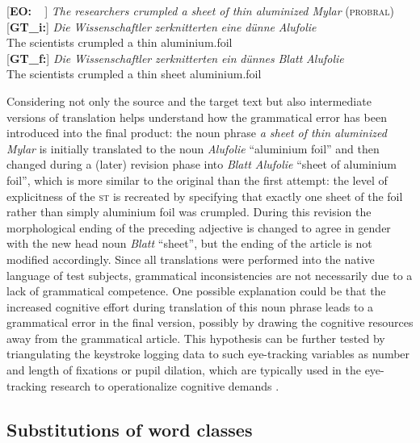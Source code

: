 \documentclass[output=paper]{LSP/langsci}
\begin{document}
\ea \label{ex:1:7}
\begin{xlist}
\exi{}[\textbf{EO:~~}]{ \emph{The researchers crumpled a sheet of thin aluminized Mylar} (\textsc{probral})}
\exi{}[\textbf{GT\_i:}]{
\gll \emph{Die} \emph{Wissenschaftler} \emph{zerknitterten} \emph{eine} \emph{dünne} \emph{Alufolie}\\
 The scientists crumpled a thin aluminium.foil\\
}
\exi{}[\textbf{GT\_f:}]{
\gll \emph{Die} \emph{Wissenschaftler} \emph{zerknitterten} \emph{ein} \emph{dünnes} \emph{Blatt} \emph{Alufolie}\\
The scientists crumpled a thin sheet aluminium.foil\\
}
\end{xlist}
\z

Considering not only the source and the target text but also intermediate versions of translation helps understand how the grammatical error has been introduced into the final product: the noun phrase \textit{a sheet of thin aluminized Mylar} is initially translated to the noun \textit{Alufolie} “aluminium foil” and then changed during a (later) revision phase into \textit{Blatt Alufolie} “sheet of aluminium foil”, which is more similar to the original than the first attempt: the level of explicitness of the \textsc{st} is recreated by specifying that exactly one sheet of the foil rather than simply aluminium foil was crumpled. During this revision the morphological ending of the preceding adjective is changed to agree in gender with the new head noun \textit{Blatt} “sheet”, but the ending of the article is not modified accordingly. Since all translations were performed into the native language of test subjects, grammatical inconsistencies are not necessarily due to a lack of grammatical competence. One possible explanation could be that the increased cognitive effort during translation of this noun phrase leads to a grammatical error in the final version, possibly by drawing the cognitive resources away from the grammatical article. This hypothesis can be further tested by triangulating the keystroke logging data to such eye-tracking variables as number and length of fixations or pupil dilation, which are typically used in the eye-tracking research to operationalize cognitive demands \citep[e.g.][]{Pavlovic2009}.

\subsection{Substitutions of word classes} \label{sec:1:3:4}
\end{document}
